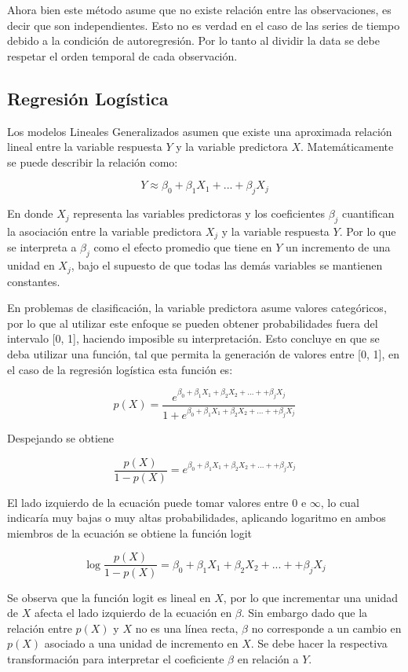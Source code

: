 \documentclass[a4paper,12pt]{Latex/Classes/PhDthesisPSnPDF}
\begin{document}
Ahora bien este método asume que no existe relación entre las observaciones, es decir que son independientes. Esto no es verdad en el caso de las series de tiempo debido a la condición de autoregresión. Por lo tanto al dividir la data se debe respetar el orden temporal de cada observación. 


\subsection{Regresión Logística}

Los modelos Lineales Generalizados asumen que existe una aproximada relación lineal entre la variable respuesta $Y$ y la variable predictora $X$. Matemáticamente se puede describir la relación como:

$$ Y \approx \beta_{0} + \beta_{1}X_{1} + ... + \beta_{j}X_{j} $$

En donde $X_{j}$ representa las variables predictoras y los coeficientes $\beta_{j}$ cuantifican la asociación entre la variable predictora $X_{j}$ y la variable respuesta $Y$. Por lo que se interpreta a $\beta_{j}$ como el efecto promedio que tiene en $Y$ un incremento de una unidad en $X_{j}$, bajo el supuesto de que todas las demás variables se mantienen constantes.

En problemas de clasificación, la variable predictora asume valores categóricos, por lo que al utilizar este enfoque se pueden obtener probabilidades fuera del intervalo [0, 1], haciendo imposible su interpretación. Esto concluye en que se deba utilizar una función, tal que permita la generación de valores entre [0, 1], en el caso de la regresión logística esta función es:

$$
p(X) = \frac{e^{\beta_{0} + \beta_{1}X_{1} + \beta_{2}X_{2} + ... + + \beta_{j}X_{j} }}{1 + e^{\beta_{0} + \beta_{1}X_{1} + \beta_{2}X_{2} + ... + + \beta_{j}X_{j} }}
$$

Despejando se obtiene

$$ \frac{p(X)}{1 - p(X)} = e^{\beta_{0} + \beta_{1}X_{1} + \beta_{2}X_{2} + ... + + \beta_{j}X_{j} } $$

El lado izquierdo de la ecuación puede tomar valores entre 0 e $\infty$, lo cual indicaría muy bajas o muy altas probabilidades, aplicando logaritmo en ambos miembros de la ecuación se obtiene la función logit

$$ \log{\frac{p(X)}{1 - p(X)}} = \beta_{0} + \beta_{1}X_{1} + \beta_{2}X_{2} + ... + + \beta_{j}X_{j}  $$

Se observa que la función logit es lineal en $X$, por lo que incrementar una unidad de $X$ afecta el lado izquierdo de la ecuación en $\beta$. Sin embargo dado que la relación entre $p(X)$ y $X$ no es una línea recta, $\beta$ no corresponde a un cambio en $p(X)$ asociado a una unidad de incremento en $X$. Se debe hacer la respectiva transformación para interpretar el coeficiente $\beta$ en relación a $Y$.
\end{document}
